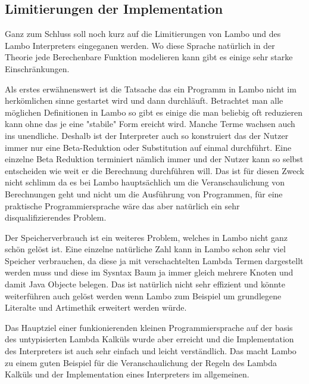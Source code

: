 \documentclass[ngerman]{article}
\begin{document}
\subsection{Limitierungen der Implementation}

Ganz zum Schluss soll noch kurz auf die Limitierungen von Lambo und des Lambo Interpreters eingeganen werden. Wo diese Sprache natürlich in der Theorie jede Berechenbare Funktion modelieren kann gibt es einige sehr starke Einschränkungen. 

Als erstes erwähnenswert ist die Tatsache das ein Programm in Lambo nicht im herkömlichen sinne gestartet wird und dann durchläuft. Betrachtet man alle möglichen Definitionen in Lambo so gibt es einige die man beliebig oft reduzieren kann ohne das je eine "stabile" Form ereicht wird. Manche Terme wachsen auch ins unendliche. Deshalb ist der Interpreter auch so konstruiert das der Nutzer immer nur eine Beta-Reduktion oder Substitution auf einmal durchführt. Eine einzelne Beta Reduktion terminiert nämlich immer und der Nutzer kann so selbst entscheiden wie weit er die Berechnung durchführen will. Das ist für diesen Zweck nicht schlimm da es bei Lambo hauptsächlich um die Veranschaulichung von Berechnungen geht und nicht um die Ausführung von Programmen, für eine praktische Programmiersprache wäre das aber natürlich ein sehr disqualifizierendes Problem.

Der Speicherverbrauch ist ein weiteres Problem, welches in Lambo nicht ganz schön gelöst ist. Eine einzelne natürliche Zahl kann in Lambo schon sehr viel Speicher verbrauchen, da diese ja mit verschachtelten Lambda Termen dargestellt werden muss und diese im Sysntax Baum ja immer gleich mehrere Knoten und damit Java Objecte belegen. Das ist natürlich nicht sehr effizient und könnte weiterführen auch gelöst werden wenn Lambo zum Beispiel um grundlegene Literalte und Artimethik erweitert werden würde.

Das Hauptziel einer funkionierenden kleinen Programmiersprache auf der basis des untypisierten Lambda Kalküls wurde aber erreicht und die Implementation des Interpreters ist auch sehr einfach und leicht verständlich. Das macht Lambo zu einem guten Beispiel für die Veranschaulichung der Regeln des Lambda Kalküls und der Implementation eines Interpreters im allgemeinen.


\printbibliography
\end{document}
